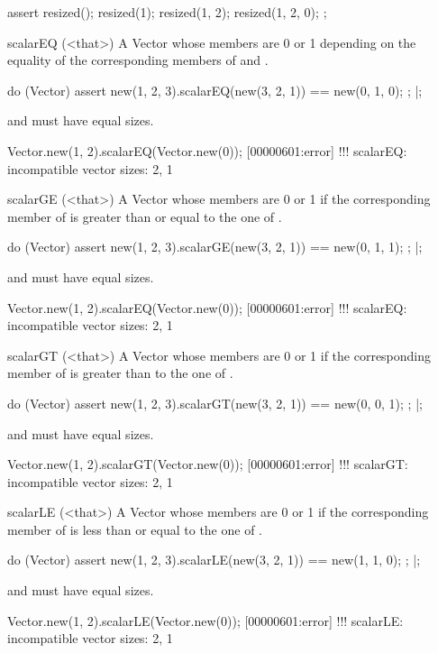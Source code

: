 \begin{urbiscriptapi}
\begin{urbiscript}
assert
{
  resized();
  resized(1);
  resized(1, 2);
  resized(1, 2, 0);
};
\end{urbiscript}


\item[scalarEQ](<that>)%
  A Vector whose members are 0 or 1 depending on the equality of the
  corresponding members of \this and \that.
\begin{urbiscript}
do (Vector)
{
  assert
  {
    new(1, 2, 3).scalarEQ(new(3, 2, 1)) == new(0, 1, 0);
  };
}|;
\end{urbiscript}
  \this and \that must have equal sizes.
\begin{urbiscript}
Vector.new(1, 2).scalarEQ(Vector.new(0));
[00000601:error] !!! scalarEQ: incompatible vector sizes: 2, 1
\end{urbiscript}


\item[scalarGE](<that>)%
  A Vector whose members are 0 or 1 if the corresponding member of \this is
  greater than or equal to the one of \that.
\begin{urbiscript}
do (Vector)
{
  assert
  {
    new(1, 2, 3).scalarGE(new(3, 2, 1)) == new(0, 1, 1);
  };
}|;
\end{urbiscript}
  \this and \that must have equal sizes.
\begin{urbiscript}
Vector.new(1, 2).scalarEQ(Vector.new(0));
[00000601:error] !!! scalarEQ: incompatible vector sizes: 2, 1
\end{urbiscript}


\item[scalarGT](<that>)%
  A Vector whose members are 0 or 1 if the corresponding member of \this is
  greater than to the one of \that.
\begin{urbiscript}
do (Vector)
{
  assert
  {
    new(1, 2, 3).scalarGT(new(3, 2, 1)) == new(0, 0, 1);
  };
}|;
\end{urbiscript}
  \this and \that must have equal sizes.
\begin{urbiscript}
Vector.new(1, 2).scalarGT(Vector.new(0));
[00000601:error] !!! scalarGT: incompatible vector sizes: 2, 1
\end{urbiscript}


\item[scalarLE](<that>)%
  A Vector whose members are 0 or 1 if the corresponding member of \this is
  less than or equal to the one of \that.
\begin{urbiscript}
do (Vector)
{
  assert
  {
    new(1, 2, 3).scalarLE(new(3, 2, 1)) == new(1, 1, 0);
  };
}|;
\end{urbiscript}
  \this and \that must have equal sizes.
\begin{urbiscript}
Vector.new(1, 2).scalarLE(Vector.new(0));
[00000601:error] !!! scalarLE: incompatible vector sizes: 2, 1
\end{urbiscript}



\end{urbiscriptapi}
